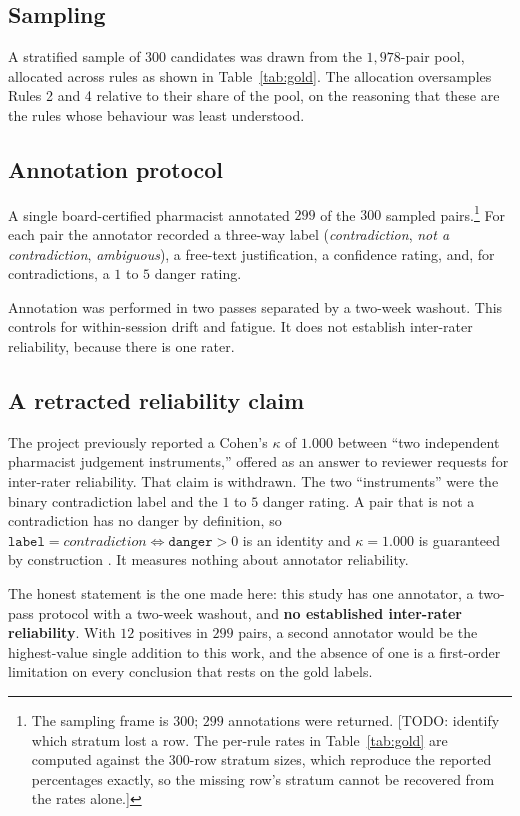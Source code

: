 \subsection{Sampling}

A stratified sample of $300$ candidates was drawn from the $1{,}978$-pair pool,
allocated across rules as shown in Table~\ref{tab:gold}. The allocation
oversamples Rules 2 and 4 relative to their share of the pool, on the reasoning
that these are the rules whose behaviour was least understood.

\subsection{Annotation protocol}

A single board-certified pharmacist annotated $299$ of the $300$ sampled
pairs.\footnote{The sampling frame is $300$; $299$ annotations were returned.
[TODO: identify which stratum lost a row. The per-rule rates in
Table~\ref{tab:gold} are computed against the $300$-row stratum sizes, which
reproduce the reported percentages exactly, so the missing row's stratum cannot
be recovered from the rates alone.]} For each pair the annotator recorded a
three-way label (\emph{contradiction}, \emph{not a contradiction},
\emph{ambiguous}), a free-text justification, a confidence rating, and, for
contradictions, a $1$ to $5$ danger rating.

Annotation was performed in two passes separated by a two-week washout. This
controls for within-session drift and fatigue. It does not establish inter-rater
reliability, because there is one rater.

\subsection{A retracted reliability claim}

The project previously reported a Cohen's $\kappa$ of $1.000$ between ``two
independent pharmacist judgement instruments,'' offered as an answer to reviewer
requests for inter-rater reliability. That claim is withdrawn. The two
``instruments'' were the binary contradiction label and the $1$ to $5$ danger
rating. A pair that is not a contradiction has no danger by definition, so
$\texttt{label} = \textit{contradiction} \iff \texttt{danger} > 0$ is an
identity and $\kappa = 1.000$ is guaranteed by construction
\citep{cohen1960kappa}. It measures nothing about annotator reliability.

The honest statement is the one made here: this study has one annotator, a
two-pass protocol with a two-week washout, and \textbf{no established inter-rater
reliability}. With $12$ positives in $299$ pairs, a second annotator would be
the highest-value single addition to this work, and the absence of one is a
first-order limitation on every conclusion that rests on the gold labels.

